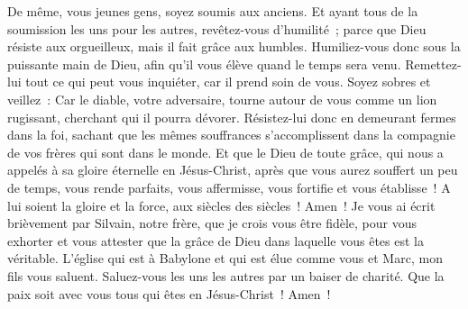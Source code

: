 \begin{multicols}{2}
De même, vous jeunes gens, soyez soumis aux anciens. Et ayant tous de la soumission les uns pour les autres, revêtez-vous d'humilité~; parce que Dieu résiste aux orgueilleux, mais il fait grâce aux humbles.
Humiliez-vous donc sous la puissante main de Dieu, afin qu'il vous élève quand le temps sera venu.
Remettez-lui tout ce qui peut vous inquiéter, car il prend soin de vous.
Soyez sobres et veillez~: Car le diable, votre adversaire, tourne autour de vous comme un lion rugissant, cherchant qui il pourra dévorer.
Résistez-lui donc en demeurant fermes dans la foi, sachant que les mêmes souffrances s'accomplissent dans la compagnie de vos frères qui sont dans le monde.
Et que le Dieu de toute grâce, qui nous a appelés à sa gloire éternelle en Jésus-Christ, après que vous aurez souffert un peu de temps, vous rende parfaits, vous affermisse, vous fortifie et vous établisse~!
A lui soient la gloire et la force, aux siècles des siècles~! Amen~!
Je vous ai écrit brièvement par Silvain, notre frère, que je crois vous être fidèle, pour vous exhorter et vous attester que la grâce de Dieu dans laquelle vous êtes est la véritable.
L'église qui est à Babylone et qui est élue comme vous et Marc, mon fils vous saluent.
Saluez-vous les uns les autres par un baiser de charité. Que la paix soit avec vous tous qui êtes en Jésus-Christ~! Amen~!
\PPE{}
\end{multicols}
